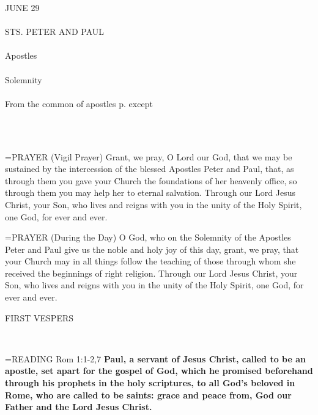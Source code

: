 \begin{center}\normalsize \begin{center}\normalsize JUNE 29\\\\
\footnotesize \footnotesize STS. PETER AND PAUL\\\\
\footnotesize \footnotesize Apostles\\\\
\footnotesize \footnotesize Solemnity\\\\
\footnotesize \footnotesize From the common of apostles p.    except	\\\\
\footnotesize \end{center}\\
\end{center}

\hangindent=\parindent \small{PRAYER 
(Vigil Prayer)
Grant, we pray, O Lord our God,
that we may be sustained
by the intercession of the blessed Apostles Peter and Paul,
that, as through them you gave your Church
the foundations of her heavenly office,
so through them you may help her to eternal salvation.
Through our Lord Jesus Christ, your Son,
who lives and reigns with you in the unity of the Holy Spirit,
one God, for ever and ever.\\}
 
\hangindent=\parindent \small{PRAYER 
(During the Day)
O God, who on the Solemnity of the Apostles Peter and Paul
give us the noble and holy joy of this day,
grant, we pray, that your Church
may in all things follow the teaching
of those through whom she received
the beginnings of right religion.
Through our Lord Jesus Christ, your Son,
who lives and reigns with you in the unity of the Holy Spirit,
one God, for ever and ever.\\}
 
\begin{flushleft}\normalsize \begin{flushleft}\normalsize FIRST VESPERS\\\end{flushleft}\\\end{flushleft}

\hangindent=\parindent \small{READING} Rom 1:1-2,7 \textbf{Paul, a servant of Jesus Christ, called to be
an apostle, set apart for the gospel of God, which he promised
beforehand through his prophets in the holy scriptures, to all God’s
beloved in Rome, who are called to be saints: grace and peace from,
God our Father and the Lord Jesus Christ.\\}
 
